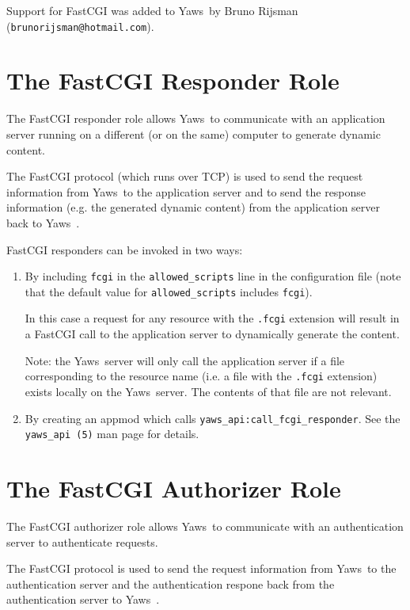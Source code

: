\documentclass[11pt,oneside,english]{book}
\newcommand{\Yaws}            %
        {{\sc Yaws}}
\begin{document}
Support for FastCGI was added to \Yaws\  by Bruno Rijsman
(\verb+brunorijsman@hotmail.com+).

\section{The FastCGI Responder Role}

The FastCGI responder role allows \Yaws\  to communicate with an
application server running on a different (or on the same) computer
to generate dynamic content.

The FastCGI protocol (which runs over TCP) is used to send the request
information from \Yaws\  to the application server and to send the
response information (e.g. the generated dynamic content) from
the application server back to \Yaws\ .

FastCGI responders can be invoked in two ways:

\begin{enumerate}

\item
By including \verb+fcgi+ in the \verb+allowed_scripts+ line
in the configuration file (note that the default value for
\verb+allowed_scripts+ includes \verb+fcgi+).

In this case a request for any resource with the \verb+.fcgi+
extension will result in a FastCGI call to the application server to
dynamically generate the content.

Note: the \Yaws\  server will only call the application server if a file
corresponding to the resource name (i.e. a file with the \verb+.fcgi+
extension) exists locally on the \Yaws\  server. The contents of that
file are not relevant.

\item
By creating an appmod which calls \verb+yaws_api:call_fcgi_responder+.
See the \verb+yaws_api (5)+ man page for details.

\end{enumerate}

\section{The FastCGI Authorizer Role}

The FastCGI authorizer role allows \Yaws\  to communicate with an
authentication server to authenticate requests.

The FastCGI protocol is used to send the request information from
\Yaws\  to the authentication server and the authentication respone back
from the authentication server to \Yaws\ .
\end{document}
